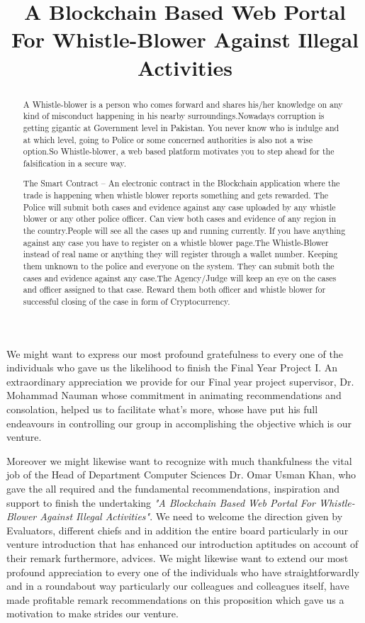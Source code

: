 \documentclass{fast-nuces-bs}
\title{A Blockchain Based Web Portal For Whistle-Blower Against Illegal Activities}
\begin{document}
\begin{acknowledgements}
	We might want to express our most profound gratefulness to every one of the individuals who gave us the likelihood to finish the Final Year Project I. An extraordinary appreciation we provide for our Final year project supervisor,  Dr. Mohammad Nauman whose commitment in animating recommendations and consolation, helped us to facilitate what's more, whose have put his full endeavours in controlling our group in accomplishing the objective which is our venture. 
	
	Moreover we might likewise want to recognize with much thankfulness the vital job 
	of the Head of Department Computer Sciences Dr. Omar Usman Khan, who gave the all 
	required and the fundamental recommendations, inspiration and support to finish the 
	undertaking  \emph{"A Blockchain Based Web Portal For Whistle-Blower Against Illegal Activities"}. We need to welcome the direction given by Evaluators, different chiefs and in addition the entire board particularly in our venture introduction that has enhanced our introduction aptitudes on account of their remark furthermore, advices. We might likewise want to extend our most profound appreciation to every one of the individuals who have 
	straightforwardly and in a roundabout way particularly our colleagues and colleagues itself, have made profitable remark recommendations on this proposition which gave us a motivation to make strides our venture.
\end{acknowledgements}

\begin{abstract}
A Whistle-blower is a person who comes forward and shares his/her knowledge on any kind of misconduct happening in his nearby surroundings.Nowadays corruption is getting gigantic at Government level in Pakistan. You never know who is indulge and at which level, going to Police or some concerned authorities is also not a wise option.So Whistle-blower, a web based platform motivates you to step ahead for the falsification in a secure way. 

The Smart Contract – An electronic contract in the Blockchain application where the trade is happening when whistle blower reports something and gets rewarded. The Police will submit both cases and evidence against any case uploaded by any whistle blower or any other police officer. Can view both cases and evidence of any region in the country.People will see all the cases up and running currently. If you have anything against any case you have to register on a whistle blower page.The Whistle-Blower instead of real name or anything they will register through a wallet number. Keeping them unknown to the police and everyone on the system. They can submit both the cases and  evidence against any case.The Agency/Judge will keep an eye on the cases and officer assigned to that case. Reward them both officer and  whistle blower for successful closing of the case in form of Cryptocurrency.
\end{abstract}
\end{document}
